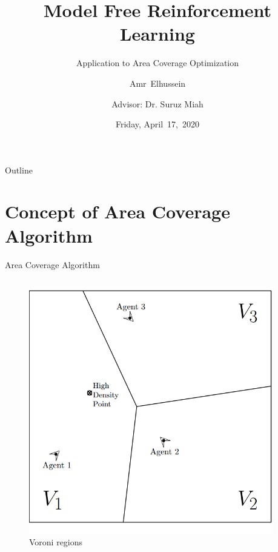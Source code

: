 \documentclass{beamer}
\title{Model Free Reinforcement Learning}
\subtitle{Application to Area Coverage Optimization}
\author[A.Elhussein]{Amr~Elhussein  \\\and
Advisor: Dr. Suruz Miah}
\institute[Bradley University] %
{
  Department of Electrical and Computer Engineering\\
  Bradley University\\
  1501 W. Bradley Avenue\\
  Peoria, IL, 61625, USA
}
\date[April~17,~2020]{Friday, April~17,~2020}
\begin{document}
\begin{frame}
  \titlepage
\end{frame}

\begin{frame}{Outline}
  \tableofcontents
\end{frame}


\section{Concept of Area Coverage Algorithm}
\begin{frame}{Area Coverage Algorithm}
\begin{columns}
\begin{column}{0.5\textwidth}
\begin{center}
\begin{figure}
\includegraphics[scale=0.2]{figs/img/voroni.png}
\caption{Voroni regions}
\end{figure}
\end{center}
\end{column}
\begin{column}{0.5\textwidth}
\begin{center}

\end{center}
\end{column}
\end{columns}
\end{frame}
\end{document}
